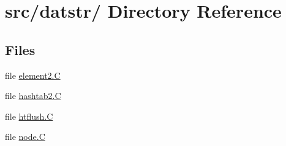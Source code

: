 \hypertarget{dir_000008}{
\section{src/datstr/ Directory Reference}
\label{dir_000008}
}
\subsection*{Files}
\begin{CompactItemize}
\item 
file \hyperlink{element2_8C}{element2.C}
\item 
file \hyperlink{hashtab2_8C}{hashtab2.C}
\item 
file \hyperlink{htflush_8C}{htflush.C}
\item 
file \hyperlink{node_8C}{node.C}
\end{CompactItemize}
